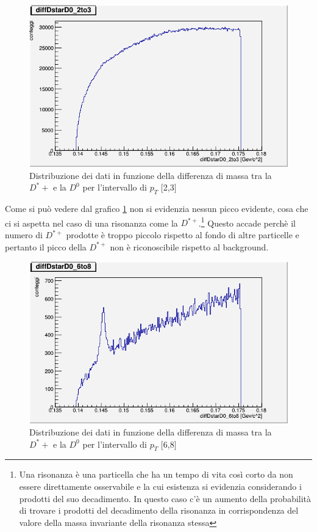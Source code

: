    \begin{figure}[htbp]
        \centering
        \includegraphics[width=0.7\linewidth]{training&testing/diffDstarD0_2to3.png}
        \caption{Distribuzione dei dati in funzione della differenza di massa tra la $D^*+$ e la $D^0$ per l'intervallo di $p_T$ [2,3]}
        \label{fig:grafmassDstar1}
    \end{figure}
    
Come si può vedere dal grafico \ref{fig:grafmassDstar1} non si evidenzia nessun picco evidente, cosa che ci si aspetta nel caso di una risonanza come la $D^{*+}$.\footnote{Una risonanza è una particella che ha un tempo di vita così corto da non essere direttamente osservabile e la cui esistenza si evidenzia considerando i prodotti del suo decadimento. In questo caso c'è un aumento della probabilità di trovare i prodotti del decadimento della risonanza in corrispondenza del valore della massa invariante della risonanza stessa} Questo accade perchè il numero di $D^{*+}$ prodotte è troppo piccolo rispetto al fondo di altre particelle e pertanto il picco della $D^{*+}$ non è riconoscibile rispetto al background.

    \begin{figure}[htbp]
        \centering
        \includegraphics[width=0.7\linewidth]{training&testing/diffDstarD0_6to8.png}
        \caption{Distribuzione dei dati in funzione della differenza di massa tra la $D^*+$ e la $D^0$ per l'intervallo di $p_T$ [6,8]}
        \label{fig:grafmassDstar2}
    \end{figure}


